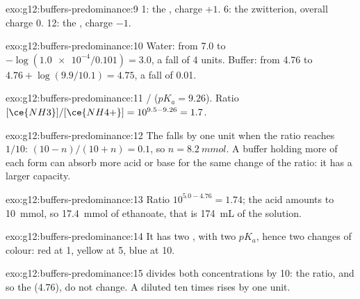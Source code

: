 \begin{solution}{exo:g12:buffers-predominance:9}
 1: the  , charge $+1$.  6: the zwitterion,
overall charge 0.  12: the  , charge $-1$.
\end{solution}

\begin{solution}{exo:g12:buffers-predominance:10}
Water: from 7.0 to $-\log(\num{1.0e-4}/0.101) = 3.0$, a fall of 4 units.
Buffer: from 4.76 to $4.76 + \log(9.9/10.1) = 4.75$, a fall of 0.01.
\end{solution}

\begin{solution}{exo:g12:buffers-predominance:11}
/ ($pK_a = 9.26$). Ratio
$[\ce{NH3}]/[\ce{NH4+}] = 10^{9.5 - 9.26} = 1.7$.
\end{solution}

\begin{solution}{exo:g12:buffers-predominance:12}
The  falls by one unit when the ratio reaches $1/10$:
$(10 - n)/(10 + n) = 0.1$, so $n = \qty{8.2}{mmol}$. A buffer holding more
of each form can absorb more acid or base for the same change of the
ratio: it has a larger capacity.
\end{solution}

\begin{solution}{exo:g12:buffers-predominance:13}
Ratio $10^{5.0 - 4.76} = 1.74$; the acid amounts to \qty{10}{mmol}, so
\qty{17.4}{mmol} of ethanoate, that is \qty{174}{mL} of the solution.
\end{solution}

\begin{solution}{exo:g12:buffers-predominance:14}
It has two , with two $pK_a$, hence two changes of
colour: red at  1, yellow at  5, blue at  10.
\end{solution}

\begin{solution}{exo:g12:buffers-predominance:15}
 divides both concentrations by 10: the ratio, and so the 
(4.76), do not change. A  diluted ten times rises by one 
unit.
\end{solution}

